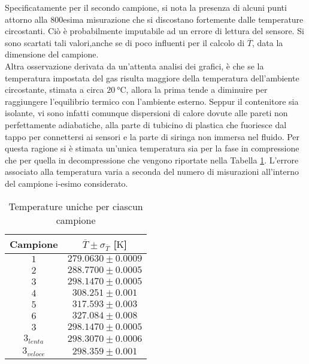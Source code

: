 \documentclass[a4paper,11pt,oneside]{article}
\begin{document}
Specificatamente per il secondo campione, si nota la presenza di alcuni punti attorno alla 800esima misurazione che si discostano fortemente dalle temperature circostanti. Ciò è probabilmente imputabile ad un errore di lettura del sensore. Si sono scartati tali valori,anche se di poco influenti per il calcolo di $\overline{T}$, data la dimensione del campione.\\
Altra osservazione derivata da un'attenta analisi dei grafici, è che se la temperatura impostata del gas risulta maggiore della temperatura dell'ambiente circostante, stimata a circa $\SI{20}{\celsius}$, allora la prima tende a diminuire per raggiungere l'equilibrio termico con l'ambiente esterno. Seppur il contenitore sia isolante, vi sono infatti comunque dispersioni di calore dovute alle pareti non perfettamente adiabatiche, alla parte di tubicino di plastica che fuoriesce dal tappo per connettersi ai sensori e la parte di siringa non immersa nel fluido. Per questa ragione si è stimata un'unica temperatura sia per la fase in compressione che per quella in decompressione che vengono riportate nella Tabella \ref{tab:temp_unica}. L'errore associato alla temperatura varia a seconda del numero di misurazioni all'interno del campione i-esimo considerato. %

\begin{table}[h!]
    \centering
    \begin{tabular}{|c|c|}
        \hline
        Campione & $\overline{T}\pm\sigma_{\overline{T}}$ [$\si{\kelvin}$] \\ \hline
        \rowcolor[rgb]{0.85,0.85,0.85}$1$ & $279.0630\pm0.0009$ \\ \hline
        $2$ & $288.7700\pm0.0005$ \\ \hline
        \rowcolor[rgb]{0.85,0.85,0.85}$3$ & $298.1470\pm0.0005$ \\ \hline
        $4$ & $308.251\pm0.001$ \\ \hline
        \rowcolor[rgb]{0.85,0.85,0.85}$5$ & $317.593\pm0.003$ \\ \hline
        $6$ & $327.084\pm0.008$ \\ \hline \hline
        \rowcolor[rgb]{0.85,0.85,0.85}$3$ & $298.1470\pm0.0005$ \\ \hline
        $3_{lenta}$ & $298.3070\pm0.0006$ \\ \hline
        \rowcolor[rgb]{0.85,0.85,0.85}$3_{veloce}$ & $298.359\pm0.001$ \\ \hline
    \end{tabular}
    \caption{Temperature uniche per ciascun campione}
    \label{tab:temp_unica}
\end{table}
\end{document}
